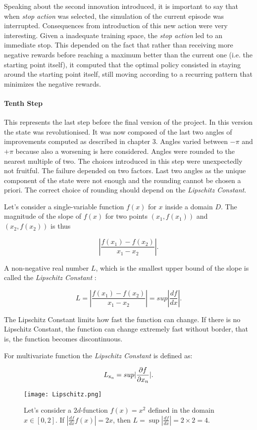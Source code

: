 Speaking about the second innovation introduced,  it is important to say that when \textit{stop action} was selected, the simulation of the current episode was interrupted. Consequences from introduction of this new action were very interesting. Given a inadequate training space, the \textit{stop action} led to an immediate stop. This depended on the fact that rather than receiving more negative rewards before reaching a maximum better than the current one (i.e. the starting point itself), it computed that the optimal policy consisted in staying around the starting point itself, still moving according to a recurring pattern that minimizes the negative rewards.

\paragraph{Tenth Step} This represents the last step before the final version of the project. In this version the state was revolutionised. It was now composed of the last two angles of improvements computed as described in chapter $3$. Angles varied between $- \pi$ and $+ \pi$ because also a worsening is here considered. Angles were rounded to the nearest multiple of two. The choices introduced in this step were unexpectedly not fruitful. The failure depended on two factors. Last two angles as the unique component of the state were not enough and the rounding cannot be chosen a priori. The correct choice of rounding should depend on the \textit{Lipschitz Constant}. 

Let's consider a single-variable function $f(x)$ for $x$ inside a domain $D$. The magnitude of the slope of $f(x)$ for two points $(x_1, f(x_1))$ and $(x_2, f(x_2))$ is thus 

\begin{equation}
	|\dfrac{f(x_1)-f(x_2)}{x_1 - x_2}|.
\end{equation}

A non-negative real number $L$, which is the smallest upper bound of the slope is called the \textit{Lipschitz Constant} :

\begin{equation}
L = |\dfrac{f(x_1)-f(x_2)}{x_1 - x_2}| = sup|\dfrac{df}{dx}|.
\end{equation}

The Lipschitz Constant limits how fast the function can change. If there is no Lipschitz Constant, the function can change extremely fast without border, that is, the function becomes discontinuous\cite{Lipschitz}.

For multivariate function the \textit{Lipschitz Constant} is defined as:

\begin{equation}
L\textsubscript{x\textsubscript{n}} = sup|\dfrac{\partial f}{\partial x_n}|.
\end{equation}

\begin{figure} [h!]
	\centering
	\texttt{[image: Lipschitz.png]}
	\caption{Let's consider a $2d$-function $f(x) = x^2$ defined in the domain $x \in [0, 2]$. If $|\frac{df}{dx} f(x) | = 2x$, then $L = \sup |\frac{df}{dx}| = 2 \times 2 = 4$.}
	\label{fig:Lipschitz}
\end{figure}

